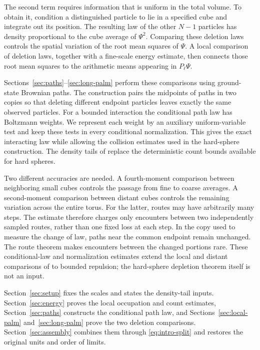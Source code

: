 The second term requires information that is uniform in the total
volume. To obtain it, condition a distinguished particle to lie in a specified
cube and integrate out its position. The resulting law of the other
$N-1$ particles has density proportional to the cube average of $\Psi^2$.
Comparing these deletion laws controls the spatial variation of the
root mean squares of $\Psi$. A local comparison of deletion laws,
together with a fine-scale energy estimate, then connects those root
mean squares to the arithmetic means appearing in $P_\ell\Psi$.

Sections~\ref{sec:paths}--\ref{sec:long-palm} perform these comparisons
using ground-state Brownian paths. The construction pairs the
midpoints of paths in two copies so that deleting different endpoint
particles leaves exactly the same observed particles. For a bounded
interaction the conditional path law has Boltzmann weights. We
represent each weight by an auxiliary uniform-variable test and keep
these tests in every conditional normalization. This gives the exact
interacting law while allowing the collision estimates used in the
hard-sphere construction. The density tails of
\cite[Lemmas~4.2 and~4.3]{C} replace the deterministic count
bounds available for hard spheres.

Two different accuracies are needed. A fourth-moment comparison between
neighboring small cubes controls the passage from fine to coarse
averages. A second-moment comparison between distant cubes controls
the remaining variation across the entire torus. For the latter,
routes may have arbitrarily many steps. The estimate therefore charges
only encounters between two independently sampled routes, rather than
one fixed loss at each step. In the copy used to measure the change of law, paths near the common
endpoint remain unchanged. The route theorem makes encounters between
the changed portions rare. These conditional-law and normalization
estimates extend the local and distant comparisons of
\cite[Sections~5,~6, and~8]{D} to bounded repulsion; the hard-sphere
depletion theorem itself is not an input.

Section~\ref{sec:setup} fixes the scales and states the density-tail
inputs. Section~\ref{sec:energy} proves the local occupation and count
estimates, Section~\ref{sec:paths} constructs the conditional path law,
and Sections~\ref{sec:local-palm} and~\ref{sec:long-palm} prove the two
deletion comparisons. Section~\ref{sec:assembly} combines them through
\eqref{eq:intro-split} and restores the original units and order of
limits.
